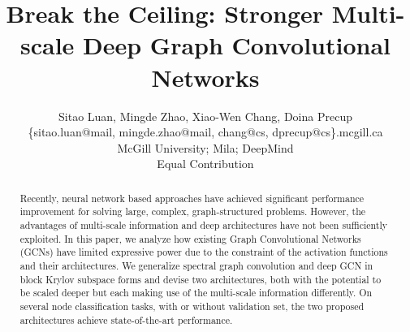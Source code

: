 \documentclass{article}
\title{Break the Ceiling: Stronger Multi-scale Deep Graph Convolutional Networks}
\author{
Sitao Luan, Mingde Zhao, Xiao-Wen Chang, Doina Precup\\
\{sitao.luan@mail, mingde.zhao@mail, chang@cs, dprecup@cs\}.mcgill.ca\\
McGill University; Mila; DeepMind\\
Equal Contribution
}
\begin{document}
\maketitle	

\begin{abstract}
Recently, neural network based approaches have achieved significant performance improvement for solving large, complex, graph-structured problems. However, the advantages of multi-scale information and deep architectures have not been sufficiently exploited. In this paper, we analyze how existing Graph Convolutional Networks (GCNs) have limited expressive power due to the constraint of the activation functions and their architectures. We generalize spectral graph convolution and deep GCN in block Krylov subspace forms and devise two architectures, both with the potential to be scaled deeper but each making use of the multi-scale information differently. On several node classification tasks, with or without validation set, the two proposed architectures achieve state-of-the-art performance.
\end{abstract}
	
\end{document}
